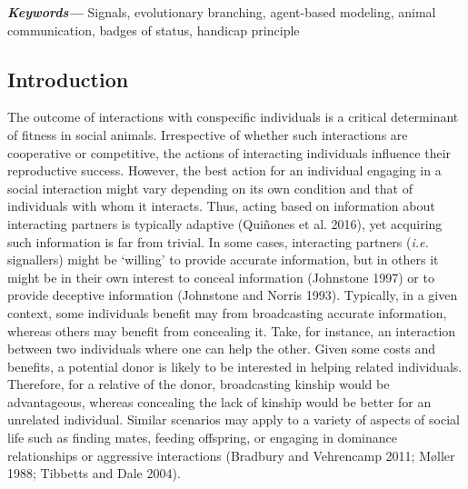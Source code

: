 \documentclass[
  12pt,
]{article}
\providecommand{\keywords}[1]{\textbf{\textit{Keywords---}} #1}
\begin{document}
\keywords{Signals, evolutionary branching, agent-based modeling, animal communication, badges of status, handicap principle}

\newpage

\hypertarget{introduction}{%
\subsection{Introduction}\label{introduction}}

The outcome of interactions with conspecific individuals is a critical
determinant of fitness in social animals. Irrespective of whether such
interactions are cooperative or competitive, the actions of interacting
individuals influence their reproductive success. However, the best
action for an individual engaging in a social interaction might vary
depending on its own condition and that of individuals with whom it
interacts. Thus, acting based on information about interacting partners
is typically adaptive (Quiñones et al. 2016), yet acquiring such
information is far from trivial. In some cases, interacting partners
(\emph{i.e.} signallers) might be `willing' to provide accurate
information, but in others it might be in their own interest to conceal
information (Johnstone 1997) or to provide deceptive information
(Johnstone and Norris 1993). Typically, in a given context, some
individuals benefit may from broadcasting accurate information, whereas
others may benefit from concealing it. Take, for instance, an
interaction between two individuals where one can help the other. Given
some costs and benefits, a potential donor is likely to be interested in
helping related individuals. Therefore, for a relative of the donor,
broadcasting kinship would be advantageous, whereas concealing the lack
of kinship would be better for an unrelated individual. Similar
scenarios may apply to a variety of aspects of social life such as
finding mates, feeding offspring, or engaging in dominance relationships
or aggressive interactions (Bradbury and Vehrencamp 2011; Møller 1988;
Tibbetts and Dale 2004).
\end{document}
